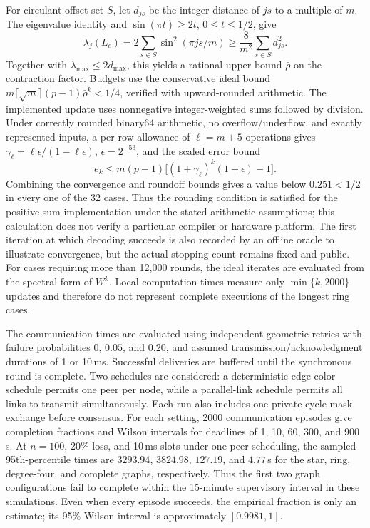 \documentclass[journal]{IEEEtran}
\begin{document}
For circulant offset set $S$, let $d_{js}$ be the integer distance of $js$ to a multiple of $m$. The eigenvalue identity and $\sin(\pi t)\geq2t$, $0\leq t\leq1/2$, give
\[
 \lambda_j(L_c)=2\sum_{s\in S}\sin^2(\pi js/m)
 \geq\frac{8}{m^2}\sum_{s\in S}d_{js}^2.
\]
Together with $\lambda_{\max}\leq2d_{\max}$, this yields a rational upper bound $\bar\rho$ on the contraction factor. Budgets use the conservative ideal bound $m\lceil\sqrt m\rceil(p-1)\bar\rho^k<1/4$, verified with upward-rounded arithmetic. The implemented update uses nonnegative integer-weighted sums followed by division. Under correctly rounded binary64 arithmetic, no overflow/underflow, and exactly represented inputs, a per-row allowance of $\ell=m+5$ operations gives $\gamma_\ell=\ell\epsilon/(1-\ell\epsilon)$, $\epsilon=2^{-53}$, and the scaled error bound
\[
 e_k\leq m(p-1)\big[(1+\gamma_\ell)^k(1+\epsilon)-1\big].
\]
Combining the convergence and roundoff bounds gives a value below $0.251<1/2$ in every one of the 32 cases. Thus the rounding condition is satisfied for the positive-sum implementation under the stated arithmetic assumptions; this calculation does not verify a particular compiler or hardware platform. The first iteration at which decoding succeeds is also recorded by an offline oracle to illustrate convergence, but the actual stopping count remains fixed and public. For cases requiring more than 12,000 rounds, the ideal iterates are evaluated from the spectral form of $W^k$. Local computation times measure only $\min\{k,2000\}$ updates and therefore do not represent complete executions of the longest ring cases.

The communication times are evaluated using independent geometric retries with failure probabilities $0$, $0.05$, and $0.20$, and assumed transmission/acknowledgment durations of 1 or 10\,ms. Successful deliveries are buffered until the synchronous round is complete. Two schedules are considered: a deterministic edge-color schedule permits one peer per node, while a parallel-link schedule permits all links to transmit simultaneously. Each run also includes one private cycle-mask exchange before consensus. For each setting, 2000 communication episodes give completion fractions and Wilson intervals for deadlines of 1, 10, 60, 300, and 900\,s. At $n=100$, 20\% loss, and 10\,ms slots under one-peer scheduling, the sampled 95th-percentile times are $3293.94$, $3824.98$, $127.19$, and $4.77$\,s for the star, ring, degree-four, and complete graphs, respectively. Thus the first two graph configurations fail to complete within the 15-minute supervisory interval in these simulations. Even when every episode succeeds, the empirical fraction is only an estimate; its 95\% Wilson interval is approximately $[0.9981,1]$.
\end{document}
